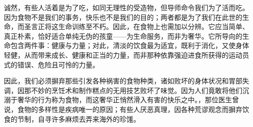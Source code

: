 诚然，有些人活着是为了吃，如同无理性的受造物，但导师命令我们为了活而吃。因为食物不是我们的事务，快乐也不是我们的目的；两者都是为了我们在此世的生命，而圣言正将这生命训练至不朽。因此，在食物上也需加以分辨。它应当简单、真正朴素，恰好适合单纯无伪的孩童——为生命服务，而非为奢华。它所导向的生命包含两件事：健康与力量；对此，清淡的饮食最为适宜，既利于消化，又使身体轻健，从而带来成长、健康和正当的力量，而非那种依靠强迫进食所获得的运动员式的错误、危险且可怜的力量。\par

因此，我们必须摒弃那些引发各种祸害的食物种类，诸如败坏的身体状况和胃部失调，因那不妙的烹饪术和制作糕点的无用技艺败坏了味觉。因为人们竟敢将他们沉溺于奢华的行为称为食物，而这奢华正悄然滑入有害的快乐之中。，那位医生曾说，食物的多样性是疾病唯一的原因；有些人厌恶真理，因各种荒谬观念而摒弃饮食的节制，自寻许多麻烦去弄来海外的珍馐。\par

